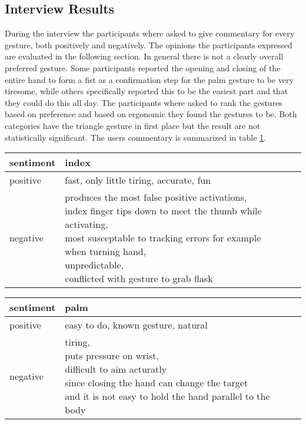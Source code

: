 \subsection{Interview Results}
During the interview the participants where asked to give commentary for every gesture, both positively and negatively. The opinions the participants expressed are evaluated in the following section. In general there is not a clearly overall preferred gesture. Some participants reported the opening and closing of the entire hand to form a fist as a confirmation step for the palm gesture to be very tiresome, while others specifically reported this to be the easiest part and that they could do this all day. The participants where asked to rank the gestures based on preference and based on ergonomic they found the gestures to be. Both categories have the triangle gesture in first place but the result are not statistically significant. The users commentary is summarized in table \ref{tbl:interview1}. 

\begin{table}[]
\begin{tabular}{llll}
\hline
sentiment &
    index \\ \hline
\multicolumn{1}{|l|}{positive} &
    \multicolumn{1}{l|}{fast, only little tiring, accurate, fun} \\ \hline
negative &
    \makecell{produces the most false positive activations, \\index finger tips down to meet the thumb while activating, \\most susceptable to tracking errors for example when turning hand, \\unpredictable, \\conflicted with gesture to grab flask} \\ \hline
\end{tabular}%
\label{tbl:interview1}
\end{table}

\begin{table}[]
\begin{tabular}{llll}
\hline
sentiment &
    palm \\ \hline
\multicolumn{1}{|l|}{positive} &
    \multicolumn{1}{l|}{easy to do, known gesture, natural} \\ \hline
negative &
    \makecell{tiring,\\ puts pressure on wrist,\\ difficult to aim acturatly \\ since closing the hand can change the target\\ and it is not easy to hold the hand parallel to the body} \\ \hline
\end{tabular}%
\label{tbl:interview2}
\end{table}

